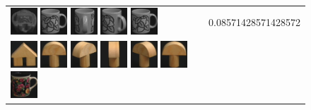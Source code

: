 \begin{figure}[tbp]
\begin{center}
\begin{tabular}{m{11cm} | m{3cm} |}
\includegraphics[width=1cm]{coil/beeld-26.eps}
\includegraphics[width=1cm]{coil/beeld-48.eps}
\includegraphics[width=1cm]{coil/beeld-50.eps}
\includegraphics[width=1cm]{coil/beeld-49.eps}
\includegraphics[width=1cm]{coil/beeld-48.eps}
& {\scriptsize 0.08571428571428572}
\\
\includegraphics[width=1cm]{coil/beeld-42.eps}
\includegraphics[width=1cm]{coil/beeld-0.eps}
\includegraphics[width=1cm]{coil/beeld-3.eps}
\includegraphics[width=1cm]{coil/beeld-2.eps}
\includegraphics[width=1cm]{coil/beeld-4.eps}
\includegraphics[width=1cm]{coil/beeld-1.eps}
\includegraphics[width=1cm]{coil/beeld-60.eps}

\end{tabular}
\end{center}
\end{figure}
